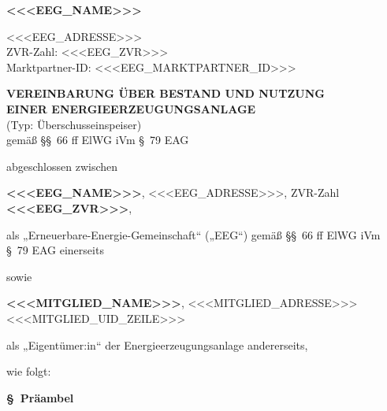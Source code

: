 \documentclass[a4paper,11pt]{article}
\newcounter{parasec}
\newcounter{parasubsec}[parasec]
\newcommand{\parasec}[1]{%
  \stepcounter{parasec}%
  \setcounter{parasubsec}{0}%
  \par\Needspace*{5\baselineskip}%
  \bigskip
  {\large\bfseries\color{tuerkis}\S\ \theparasec\quad #1}\par\nopagebreak
  \smallskip\nopagebreak
}
\begin{document}
\noindent
\begin{minipage}[t]{0.55\textwidth}
  \raggedright{}
  {\LARGE\bfseries\color{tuerkis}<<<EEG_NAME>>>\par}
\end{minipage}%
\begin{minipage}[t]{0.45\textwidth}
  \raggedleft
  \small
  <<<EEG_ADRESSE>>>\\
  ZVR-Zahl: <<<EEG_ZVR>>>\\
  Marktpartner-ID: <<<EEG_MARKTPARTNER_ID>>>
\end{minipage}

\bigskip
{}

\bigskip

\begin{center}
  {\Large\bfseries VEREINBARUNG ÜBER BESTAND UND NUTZUNG}\\[0.2em]
  {\Large\bfseries EINER ENERGIEERZEUGUNGSANLAGE}\\[0.3em]
  {\normalsize (Typ: Überschusseinspeiser)}\\[0.5em]
  {\small gemäß \S\S\ 66 ff ElWG iVm \S\ 79 EAG}
\end{center}

\bigskip

\noindent abgeschlossen zwischen

\bigskip

\noindent \textbf{<<<EEG_NAME>>>}, <<<EEG_ADRESSE>>>, ZVR-Zahl \textbf{<<<EEG_ZVR>>>},

\smallskip
\noindent als „Erneuerbare-Energie-Gemeinschaft“ („EEG“) gemäß \S\S\ 66 ff ElWG iVm \S\ 79 EAG einerseits

\bigskip
\noindent sowie

\bigskip
\noindent \textbf{<<<MITGLIED_NAME>>>}, <<<MITGLIED_ADRESSE>>>\\
<<<MITGLIED_UID_ZEILE>>>

\smallskip
\noindent als „Eigentümer:in“ der Energieerzeugungsanlage andererseits,

\bigskip
\noindent wie folgt:

\parasec{Präambel}
\end{document}
